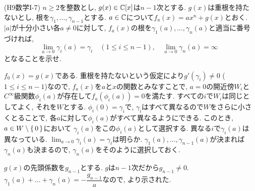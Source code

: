 \begin{egprob} (H9数学I-7)
$n\geq 2$を整数とし, $g(x)\in \mathbb{C}[x]$は$n-1$次とする. $g(x)$は重根を持たないとし, 根を$\gamma_1,\dots, \gamma_{n-1}$とする. $a\in \mathbb{C}$について$f_a(x) = ax^n + g(x)$とおく. $|a|$が十分小さい各$a\neq 0$に対して, $f_a(x)$の根を$\gamma_1(a),\dots, \gamma_n(a)$と適当に番号づければ,
\[\lim_{a\to 0} \gamma_i(a) = \gamma_i \quad (1\leq i\leq n-1),\quad \lim_{a\to 0} \gamma_n(a) = \infty\]
となることを示せ.
\end{egprob}
\begin{egans}
$f_0(x) = g(x)$である. 重根を持たないという仮定により$g'(\gamma_{i}) \neq 0$ ($1\leq i\leq n-1$)なので,  $f_a(x)$を$a$と$x$の関数とみなすことで, $a=0$の開近傍$W_i$と$C^{\infty}$級関数$\phi_i(a)$が存在して$f_a(\phi_i(a)) = 0$を満たす. すべての$i$で$W_i$は同じとしてよく, それを$W$とする. $\phi_i(0) = \gamma_i$で, $\gamma_i$はすべて異なるので$W$をさらに小さくとることで, 各$a$に対して$\phi_i(a)$がすべて異なるようにできる. このとき, $a\in W\setminus{\set{0}}$において $\gamma_i(a)$をこの$\phi_i(a)$として選択する. 異なる$i$で$\gamma_i(a)$は異なっている. $\lim_{a\to 0} \gamma_i(a) = \gamma_i$は明らか. $\gamma_1(a),\dots, \gamma_{n-1}(a)$が決まれば $\gamma_n(a)$も決まるので, $\gamma_n(a)$をそのように選択しておく. \par $g(x)$の先頭係数を$g_{n-1}$とする. $g$は$n-1$次だから$g_{n-1}\neq 0$.  $\gamma_1(a) + \dots + \gamma_n(a) = -\dfrac{g_{n-1}}{a}$なので,
より示された.
\end{egans}











\newpage




\newpage





\newpage
